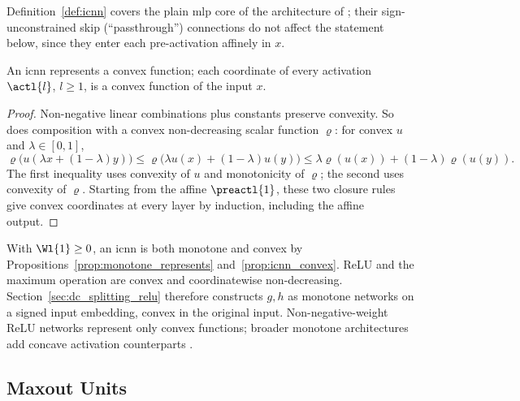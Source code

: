 Definition~\ref{def:icnn} covers the plain \ac{mlp} core of the architecture of \textcite{Amos2017}; their sign-unconstrained skip (``passthrough'') connections do not affect the statement below, since they enter each pre-activation affinely in $x$.

\begin{proposition}\label{prop:icnn_convex}
An \ac{icnn} represents a convex function; each coordinate of every activation $\actl{l}$, $l \ge 1$, is a convex function of the input $x$.\end{proposition}

\begin{proof}
Non-negative linear combinations plus constants preserve convexity. So does composition with a convex non-decreasing scalar function $\varrho$: for convex $u$ and $\lambda\in[0,1]$,
\[
\varrho\bigl(u(\lambda x+(1-\lambda)y)\bigr)
\le\varrho\bigl(\lambda u(x)+(1-\lambda)u(y)\bigr)
\le\lambda\varrho(u(x))+(1-\lambda)\varrho(u(y)).
\]
The first inequality uses convexity of $u$ and monotonicity of $\varrho$; the second uses convexity of $\varrho$. Starting from the affine $\preactl{1}$, these two closure rules give convex coordinates at every layer by induction, including the affine output.
\end{proof}

\begin{remark}\label{rem:monotone_convex_combined}
With $\Wl{1}\ge0$, an \ac{icnn} is both monotone and convex by Propositions~\ref{prop:monotone_represents} and~\ref{prop:icnn_convex}. ReLU and the maximum operation are convex and coordinatewise non-decreasing. Section~\ref{sec:dc_splitting_relu} therefore constructs $g,h$ as monotone networks on a signed input embedding, convex in the original input. Non-negative-weight ReLU networks represent only convex functions; broader monotone architectures add concave activation counterparts \parencite{Runje_2023}.
\end{remark}

\subsection{Maxout Units}

